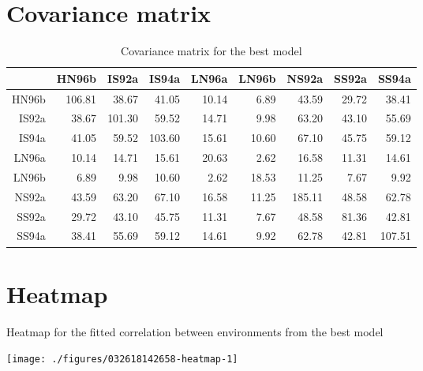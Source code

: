\documentclass[a4paper,11pt]{article}\usepackage[]{graphicx}\usepackage[]{color}
\newenvironment{knitrout}{}{} %
\begin{document}
\clearpage
\section{Covariance matrix}
\begin{table}[ht]
\begin{flushleft}
\caption{Covariance matrix for the best model} 
\begin{tabular}{rrrrrrrrr}
  \hline
 & HN96b & IS92a & IS94a & LN96a & LN96b & NS92a & SS92a & SS94a \\ 
  \hline
HN96b & 106.81 & 38.67 & 41.05 & 10.14 & 6.89 & 43.59 & 29.72 & 38.41 \\ 
  IS92a & 38.67 & 101.30 & 59.52 & 14.71 & 9.98 & 63.20 & 43.10 & 55.69 \\ 
  IS94a & 41.05 & 59.52 & 103.60 & 15.61 & 10.60 & 67.10 & 45.75 & 59.12 \\ 
  LN96a & 10.14 & 14.71 & 15.61 & 20.63 & 2.62 & 16.58 & 11.31 & 14.61 \\ 
  LN96b & 6.89 & 9.98 & 10.60 & 2.62 & 18.53 & 11.25 & 7.67 & 9.92 \\ 
  NS92a & 43.59 & 63.20 & 67.10 & 16.58 & 11.25 & 185.11 & 48.58 & 62.78 \\ 
  SS92a & 29.72 & 43.10 & 45.75 & 11.31 & 7.67 & 48.58 & 81.36 & 42.81 \\ 
  SS94a & 38.41 & 55.69 & 59.12 & 14.61 & 9.92 & 62.78 & 42.81 & 107.51 \\ 
   \hline
\end{tabular}
\end{flushleft}
\end{table}


\section{Heatmap}
Heatmap for the fitted correlation between environments from the best model
\begin{knitrout}
\color{fgcolor}

\texttt{[image: ./figures/032618142658-heatmap-1]} \hfill{}



\end{knitrout}

\end{document}

